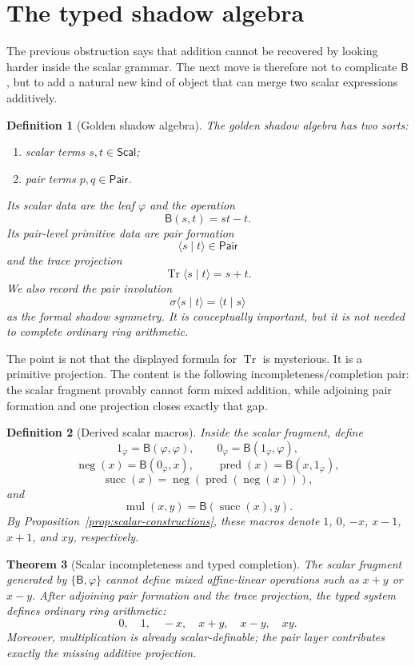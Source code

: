 \documentclass[11pt]{article}
\newtheorem{definition}{Definition}[section]
\newtheorem{theorem}[definition]{Theorem}
\newcommand{\B}{\mathsf{B}}
\newcommand{\Scl}{\mathsf{Scal}}
\newcommand{\Pair}{\mathsf{Pair}}
\newcommand{\Tr}{\operatorname{Tr}}
\newcommand{\sig}{\sigma}
\newcommand{\ph}{\varphi}
\begin{document}
\section{The typed shadow algebra}

The previous obstruction says that addition cannot be recovered by looking harder inside the scalar grammar.  The next move is therefore not to complicate $\B$, but to add a natural new kind of object that can merge two scalar expressions additively.

\begin{definition}[Golden shadow algebra]
The golden shadow algebra has two sorts:
\begin{enumerate}[label=(\roman*)]
    \item scalar terms $s,t\in\Scl$;
    \item pair terms $p,q\in\Pair$.
\end{enumerate}
Its scalar data are the leaf $\ph$ and the operation
\[
    \B(s,t)=st-t.
\]
Its pair-level primitive data are pair formation
\[
    \langle s\mid t\rangle\in\Pair
\]
and the trace projection
\[
    \Tr\langle s\mid t\rangle=s+t.
\]
We also record the pair involution
\[
    \sig\langle s\mid t\rangle=\langle t\mid s\rangle
\]
as the formal shadow symmetry.  It is conceptually important, but it is not needed to complete ordinary ring arithmetic.
\end{definition}

The point is not that the displayed formula for $\Tr$ is mysterious.  It is a primitive projection.  The content is the following incompleteness/completion pair: the scalar fragment provably cannot form mixed addition, while adjoining pair formation and one projection closes exactly that gap.

\begin{definition}[Derived scalar macros]\label{def:derived-macros}
Inside the scalar fragment, define
\[
    1_\ph=\B(\ph,\ph),\qquad 0_\ph=\B(1_\ph,\ph),
\]
\[
    \operatorname{neg}(x)=\B(0_\ph,x),\qquad \operatorname{pred}(x)=\B(x,1_\ph),
\]
\[
    \operatorname{succ}(x)=\operatorname{neg}(\operatorname{pred}(\operatorname{neg}(x))),
\]
and
\[
    \operatorname{mul}(x,y)=\B(\operatorname{succ}(x),y).
\]
By Proposition~\ref{prop:scalar-constructions}, these macros denote $1$, $0$, $-x$, $x-1$, $x+1$, and $xy$, respectively.
\end{definition}

\begin{theorem}[Scalar incompleteness and typed completion]\label{thm:completion}
The scalar fragment generated by $\{\B,\ph\}$ cannot define mixed affine-linear operations such as $x+y$ or $x-y$.  After adjoining pair formation and the trace projection, the typed system defines ordinary ring arithmetic:
\[
    0,\quad 1,\quad -x,\quad x+y,\quad x-y,\quad xy.
\]
Moreover, multiplication is already scalar-definable; the pair layer contributes exactly the missing additive projection.
\end{theorem}
\end{document}
